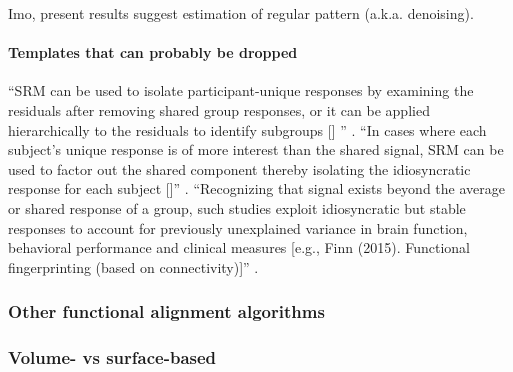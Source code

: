 %
Imo, present results suggest estimation of regular pattern (a.k.a. denoising).


\paragraph{Templates that can probably be dropped}
%
``SRM can be used to isolate participant-unique responses by examining the
residuals after removing shared group responses, or it can be applied
hierarchically to the residuals to identify subgroups [\citet{chen2017shared}]
'' \citep{cohen2017computational}.
%
``In cases where each subject's unique response is of more interest than the
shared signal, SRM can be used to factor out the shared component thereby
isolating the idiosyncratic response for each subject
[\citep{chen2015reduced}]'' \citep{kumar2020brainiak}.
%
``Recognizing that signal exists beyond the average or shared response of a
group, such studies exploit idiosyncratic but stable responses to account for
previously unexplained variance in brain function, behavioral performance and
clinical measures [e.g., Finn (2015). Functional fingerprinting (based on
connectivity)]'' \citep{cohen2017computational}.




\subsubsection{Other functional alignment algorithms}




\subsubsection{Volume- vs surface-based}




